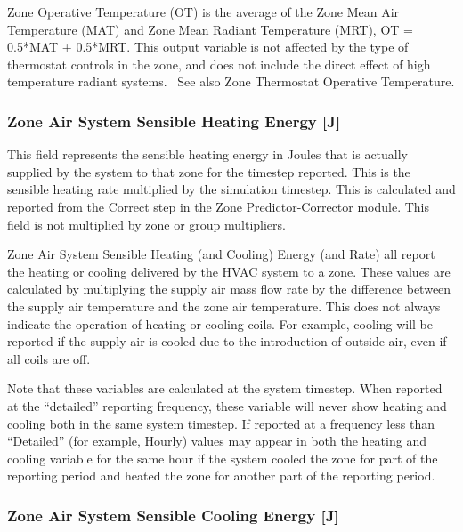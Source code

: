 Zone Operative Temperature (OT) is the average of the Zone Mean Air Temperature (MAT) and Zone Mean Radiant Temperature (MRT), OT = 0.5*MAT + 0.5*MRT. This output variable is not affected by the type of thermostat controls in the zone, and does not include the direct effect of high temperature radiant systems.~ See also Zone Thermostat Operative Temperature.

\subsubsection{Zone Air System Sensible Heating Energy {[}J{]}}\label{zone-air-system-sensible-heating-energy-j-1}

This field represents the sensible heating energy in Joules that is actually supplied by the system to that zone for the timestep reported. This is the sensible heating rate multiplied by the simulation timestep. This is calculated and reported from the Correct step in the Zone Predictor-Corrector module. This field is not multiplied by zone or group multipliers.

\begin{callout}
Zone Air System Sensible Heating (and Cooling) Energy (and Rate) all report the heating or cooling delivered by the HVAC system to a zone. These values are calculated by multiplying the supply air mass flow rate by the difference between the supply air temperature and the zone air temperature. This does not always indicate the operation of heating or cooling coils. For example, cooling will be reported if the supply air is cooled due to the introduction of outside air, even if all coils are off.

Note that these variables are calculated at the system timestep. When reported at the ``detailed'' reporting frequency, these variable will never show heating and cooling both in the same system timestep. If reported at a frequency less than ``Detailed'' (for example, Hourly) values may appear in both the heating and cooling variable for the same hour if the system cooled the zone for part of the reporting period and heated the zone for another part of the reporting period.
\end{callout}

\subsubsection{Zone Air System Sensible Cooling Energy {[}J{]}}\label{zone-air-system-sensible-cooling-energy-j-1}

